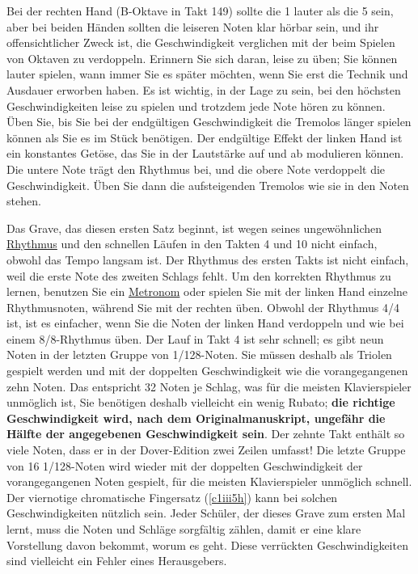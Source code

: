 Bei der rechten Hand (B-Oktave in Takt 149) sollte die 1 lauter als die 5 sein, aber bei beiden Händen sollten die leiseren Noten klar hörbar sein, und ihr offensichtlicher Zweck ist, die Geschwindigkeit verglichen mit der beim Spielen von Oktaven zu verdoppeln.
Erinnern Sie sich daran, leise zu üben; Sie können lauter spielen, wann immer Sie es später möchten, wenn Sie erst die Technik und Ausdauer erworben haben.
Es ist wichtig, in der Lage zu sein, bei den höchsten Geschwindigkeiten leise zu spielen und trotzdem jede Note hören zu können.
Üben Sie, bis Sie bei der endgültigen Geschwindigkeit die Tremolos länger spielen können als Sie es im Stück benötigen.
Der endgültige Effekt der linken Hand ist ein konstantes Getöse, das Sie in der Lautstärke auf und ab modulieren können.
Die untere Note trägt den Rhythmus bei, und die obere Note verdoppelt die Geschwindigkeit.
Üben Sie dann die aufsteigenden Tremolos wie sie in den Noten stehen.

Das Grave, das diesen ersten Satz beginnt, ist wegen seines ungewöhnlichen \hyperref[c1iii1b]{Rhythmus} und den schnellen Läufen in den Takten 4 und 10 nicht einfach, obwohl das Tempo langsam ist.
Der Rhythmus des ersten Takts ist nicht einfach, weil die erste Note des zweiten Schlags fehlt.
Um den korrekten Rhythmus zu lernen, benutzen Sie ein \hyperref[c1ii19]{Metronom} oder spielen Sie mit der linken Hand einzelne Rhythmusnoten, während Sie mit der rechten üben.
Obwohl der Rhythmus 4/4 ist, ist es einfacher, wenn Sie die Noten der linken Hand verdoppeln und wie bei einem 8/8-Rhythmus üben.
Der Lauf in Takt 4 ist sehr schnell; es gibt neun Noten in der letzten Gruppe von 1/128-Noten.
Sie müssen deshalb als Triolen gespielt werden und mit der doppelten Geschwindigkeit wie die vorangegangenen zehn Noten.
Das entspricht 32 Noten je Schlag, was für die meisten Klavierspieler unmöglich ist, Sie benötigen deshalb vielleicht ein wenig Rubato; \textbf{die richtige Geschwindigkeit wird, nach dem Originalmanuskript, ungefähr die Hälfte der angegebenen Geschwindigkeit sein}.
Der zehnte Takt enthält so viele Noten, dass er in der Dover-Edition zwei Zeilen umfasst!
Die letzte Gruppe von 16 1/128-Noten wird wieder mit der doppelten Geschwindigkeit der vorangegangenen Noten gespielt, für die meisten Klavierspieler unmöglich schnell.
Der viernotige chromatische Fingersatz (\hyperref[c1iii5h]{\autoref{c1iii5h}}) kann bei solchen Geschwindigkeiten nützlich sein.
Jeder Schüler, der dieses Grave zum ersten Mal lernt, muss die Noten und Schläge sorgfältig zählen, damit er eine klare Vorstellung davon bekommt, worum es geht.
Diese verrückten Geschwindigkeiten sind vielleicht ein Fehler eines Herausgebers.

